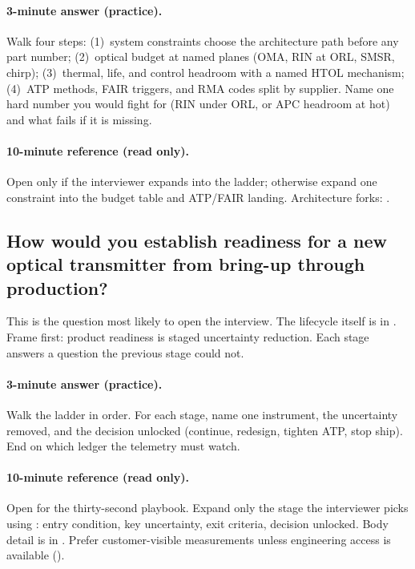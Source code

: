 \paragraph{3-minute answer (practice).}
Walk four steps: (1)~system constraints choose the architecture path before
any part number; (2)~optical budget at named planes (OMA, RIN at ORL, SMSR,
chirp); (3)~thermal, life, and control headroom with a named
HTOL mechanism; (4)~ATP methods, FAIR triggers,
and RMA codes split by supplier. Name one hard number you would
fight for (RIN under ORL, or APC headroom at hot) and what fails if it is
missing.

\paragraph{10-minute reference (read only).}
Open  only if the interviewer expands into the ladder;
otherwise expand one constraint into the budget table and ATP/FAIR landing.
Architecture forks: .

\subsection{How would you establish readiness for a new optical transmitter from
bring-up through production?}
\label{sec:interview-worked-validation}

This is the question most likely to open the interview. The lifecycle itself is
in . Frame first: product
readiness is staged uncertainty reduction. Each stage answers a question the
previous stage could not.


\paragraph{3-minute answer (practice).}
Walk the ladder in order. For each stage, name one instrument, the uncertainty
removed, and the decision unlocked (continue, redesign, tighten ATP, stop
ship). End on which ledger the telemetry must watch.

\paragraph{10-minute reference (read only).}
Open  for the thirty-second playbook. Expand only the
stage the interviewer picks using : entry
condition, key uncertainty, exit criteria, decision unlocked. Body detail is
in . Prefer customer-visible
measurements unless engineering access is available
().

